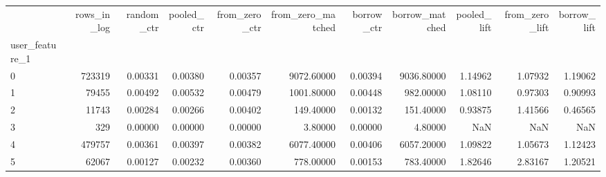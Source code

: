 \begin{tabular}{lrrrrrrrrrr}
\toprule
 & rows\_in\_log & random\_ctr & pooled\_ctr & from\_zero\_ctr & from\_zero\_matched & borrow\_ctr & borrow\_matched & pooled\_lift & from\_zero\_lift & borrow\_lift \\
user\_feature\_1 &  &  &  &  &  &  &  &  &  &  \\
\midrule
0 & 723319 & 0.00331 & 0.00380 & 0.00357 & 9072.60000 & 0.00394 & 9036.80000 & 1.14962 & 1.07932 & 1.19062 \\
1 & 79455 & 0.00492 & 0.00532 & 0.00479 & 1001.80000 & 0.00448 & 982.00000 & 1.08110 & 0.97303 & 0.90993 \\
2 & 11743 & 0.00284 & 0.00266 & 0.00402 & 149.40000 & 0.00132 & 151.40000 & 0.93875 & 1.41566 & 0.46565 \\
3 & 329 & 0.00000 & 0.00000 & 0.00000 & 3.80000 & 0.00000 & 4.80000 & NaN & NaN & NaN \\
4 & 479757 & 0.00361 & 0.00397 & 0.00382 & 6077.40000 & 0.00406 & 6057.20000 & 1.09822 & 1.05673 & 1.12423 \\
5 & 62067 & 0.00127 & 0.00232 & 0.00360 & 778.00000 & 0.00153 & 783.40000 & 1.82646 & 2.83167 & 1.20521 \\
\bottomrule
\end{tabular}
